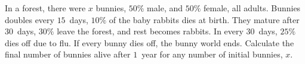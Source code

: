 {In a forest, there were $x$ bunnies, $50\%$ male, and $50\%$ female, all adults. Bunnies doubles every $15$~days, $10\%$ of the baby rabbits dies at birth. They mature after $30$~days, $30\%$ leave the forest, and rest becomes rabbits. In every $30$~days, $25\%$ dies off due to flu. If every bunny dies off, the bunny world ends.}
{Calculate the final number of bunnies alive after $1$~year for any number of initial bunnies, $x$. }
{}
{}
